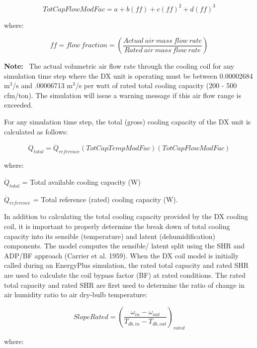 \begin{equation}
TotCapFlowModFac = a + b\left( {ff} \right) + c{\left( {ff} \right)^2} + d{\left( {ff} \right)^3}
\end{equation}

where:

\begin{equation}
ff = flow~fraction = \left( {\frac{Actual~air~mass~flow~rate}{Rated~air~mass~flow~rate}} \right)
\end{equation}

\textbf{Note:}~ The actual volumetric air flow rate through the cooling coil for any simulation time step where the DX unit is operating must be between 0.00002684 m\(^{3}\)/s and .00006713 m\(^{3}\)/s per watt of rated total cooling capacity (200 - 500 cfm/ton). The simulation will issue a warning message if this air flow range is exceeded.

For any simulation time step, the total (gross) cooling capacity of the DX unit is calculated as follows:

\begin{equation}
{\dot{Q}_{total}} = {\dot{Q}_{reference}}\left( {TotCapTempModFac} \right)\left( {TotCapFlowModFac} \right)
\end{equation}

where:

\({\dot{Q}_{total}}\) = Total available cooling capacity (W)

\({\dot{Q}_{reference}}\) = Total reference (rated) cooling capacity (W).

In addition to calculating the total cooling capacity provided by the DX cooling coil, it is important to properly determine the break down of total cooling capacity into its sensible (temperature) and latent (dehumidification) components. The model computes the sensible/ latent split using the SHR and ADP/BF approach (Carrier et al. 1959). When the DX coil model is initially called during an EnergyPlus simulation, the rated total capacity and rated SHR are used to calculate the coil bypass factor (BF) at rated conditions. The rated total capacity and rated SHR are first used to determine the ratio of change in air humidity ratio to air dry-bulb temperature:

\begin{equation}
SlopeRated = {\left( {\frac{{{\omega_{in}} - {\omega_{out}}}}{{{T_{db,in}} - {T_{db,out}}}}} \right)_{rated}}
\end{equation}

where:


